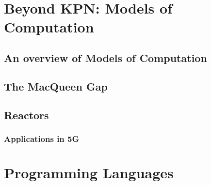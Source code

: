 \documentclass[
		twoside,openright,titlepage,numbers=noenddot,headinclude,%
	 	footinclude=true,cleardoublepage=empty,
		dottedtoc, %
		BCOR=5mm,paper=a4,fontsize=10pt, %
		ngerman,american, %
		]{scrreprt}
\begin{document}
%
%
%


%

\chapter{Beyond KPN: Models of Computation}
\label{chap:mocs}

\section{An overview of Models of Computation}
\label{sec:mocs_overview}

\section{The MacQueen Gap} %
\label{sec:macqueen}
\section{Reactors}
\label{sec:reactors}
\subsection{Applications in 5G}
\label{sec:5g}

\chapter{Programming Languages}
\label{chap:pl}

\end{document}
